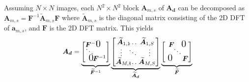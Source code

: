 \documentclass{article}
\begin{document}
Assuming $N \times N$ images, each $N^2 \times N^2$ block $\bm A_{m,s}$ of $\bm
{A_d}$ can be decomposed as $\bm A_{m,s} = \bm F^{-1} \widetilde{\bm A}_{m,s}
\bm F$ where $\widetilde{\bm A}_{m,s}$ is the diagonal matrix consisting of the
2D DFT of $\bm a_{m,s}$, and $\bm F$ is the 2D DFT matrix. This yields
\vspace{-0.1 in}
\begin{equation}
  \bm {A_d}=
  \underbrace{
    \begin{bmatrix}
      \bm F^{-1} \hspace{-0.2 in}& \hspace{-0.2 in} & \hspace{-0.20 in} \vspace{-0.1 in}\text{\Large 0} \\
        \vspace{-0.05 in}&\hspace{-0.20 in} \ddots &  \\
      \text{\Large 0} \hspace{-0.17 in}& \hspace{-0.2 in} & \hspace{-0.15 in} \bm F^{-1}
    \end{bmatrix}
  }_{\widetilde{\bm F}^{-1}}
  \underbrace{
    \begin{bmatrix}
      \widetilde{\bm A}_{1,1} \hspace{-0.1 in}&\hspace{-0.1 in} \hdots & \hspace{-0.1 in} \widetilde{\bm A}_{1,S} \vspace{-0.02 in}\\
      \vspace{-0.02 in}\vdots &\hspace{-0.1 in} \ddots& \vdots \\
      \widetilde{\bm A}_{M,1} \hspace{-0.1 in}&\hspace{-0.1 in} \hdots & \hspace{-0.1 in} \widetilde{\bm A}_{M,S} \\
    \end{bmatrix}
  }_{\widetilde{\bm A}_{\bm d}}
  \underbrace{
    \begin{bmatrix}
      \bm F \hspace{-0.1 in}& & \hspace{-0.18 in} \vspace{-0.1 in}\text{\Large 0} \\
        \vspace{-0.05 in}& \hspace{-0.12 in}\ddots &  \\
  \hspace{0.05 in} \text{\Large 0} & & \hspace{-0.12 in} \bm F
    \end{bmatrix}
  }_{\widetilde{\bm F}}
\label{eq:fourier_mtx}
\end{equation}
\vspace{-0.1 in}
\end{document}
